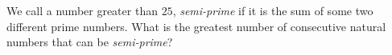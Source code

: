 We call a number greater than $25$, \textit{ semi-prime} if it is the sum of some two different prime numbers. What is the greatest number of consecutive natural numbers that can be \textit{semi-prime}?